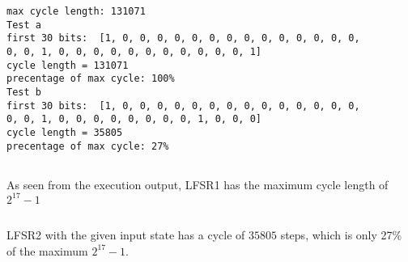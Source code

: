 \documentclass{article}
\begin{document}
\begin{lstlisting}[caption=Execution output]
max cycle length: 131071
Test a
first 30 bits:  [1, 0, 0, 0, 0, 0, 0, 0, 0, 0, 0, 0, 0, 0, 0,
0, 0, 1, 0, 0, 0, 0, 0, 0, 0, 0, 0, 0, 0, 1]
cycle length = 131071
precentage of max cycle: 100%
Test b
first 30 bits:  [1, 0, 0, 0, 0, 0, 0, 0, 0, 0, 0, 0, 0, 0, 0,
0, 0, 1, 0, 0, 0, 0, 0, 0, 0, 0, 1, 0, 0, 0]
cycle length = 35805
precentage of max cycle: 27%
\end{lstlisting}

\subsection{}
As seen from the execution output, LFSR1 has the maximum cycle length of $2^{17}-1$

\subsection{}
LFSR2 with the given input state has a cycle of $35805$ steps, which is only 27\% of the maximum $2^{17}-1$.
\end{document}
